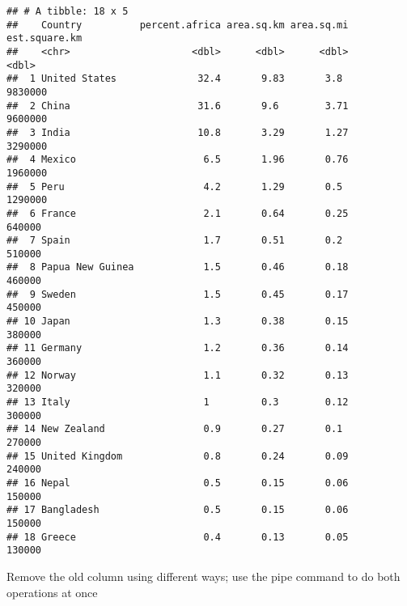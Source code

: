 \documentclass[
]{article}
\newenvironment{Shaded}{\begin{snugshade}}{\end{snugshade}}
\newcommand{\AttributeTok}[1]{\textcolor[rgb]{0.13,0.29,0.53}{#1}}
\newcommand{\CommentTok}[1]{\textcolor[rgb]{0.56,0.35,0.01}{\textit{#1}}}
\newcommand{\DecValTok}[1]{\textcolor[rgb]{0.00,0.00,0.81}{#1}}
\newcommand{\FunctionTok}[1]{\textcolor[rgb]{0.13,0.29,0.53}{\textbf{#1}}}
\newcommand{\NormalTok}[1]{#1}
\newcommand{\SpecialCharTok}[1]{\textcolor[rgb]{0.81,0.36,0.00}{\textbf{#1}}}
\begin{document}
\begin{verbatim}
## # A tibble: 18 x 5
##    Country          percent.africa area.sq.km area.sq.mi est.square.km
##    <chr>                     <dbl>      <dbl>      <dbl>         <dbl>
##  1 United States              32.4       9.83       3.8        9830000
##  2 China                      31.6       9.6        3.71       9600000
##  3 India                      10.8       3.29       1.27       3290000
##  4 Mexico                      6.5       1.96       0.76       1960000
##  5 Peru                        4.2       1.29       0.5        1290000
##  6 France                      2.1       0.64       0.25        640000
##  7 Spain                       1.7       0.51       0.2         510000
##  8 Papua New Guinea            1.5       0.46       0.18        460000
##  9 Sweden                      1.5       0.45       0.17        450000
## 10 Japan                       1.3       0.38       0.15        380000
## 11 Germany                     1.2       0.36       0.14        360000
## 12 Norway                      1.1       0.32       0.13        320000
## 13 Italy                       1         0.3        0.12        300000
## 14 New Zealand                 0.9       0.27       0.1         270000
## 15 United Kingdom              0.8       0.24       0.09        240000
## 16 Nepal                       0.5       0.15       0.06        150000
## 17 Bangladesh                  0.5       0.15       0.06        150000
## 18 Greece                      0.4       0.13       0.05        130000
\end{verbatim}

Remove the old column using different ways; use the pipe command to do
both operations at once

\begin{Shaded}
\end{Shaded}
\end{document}

